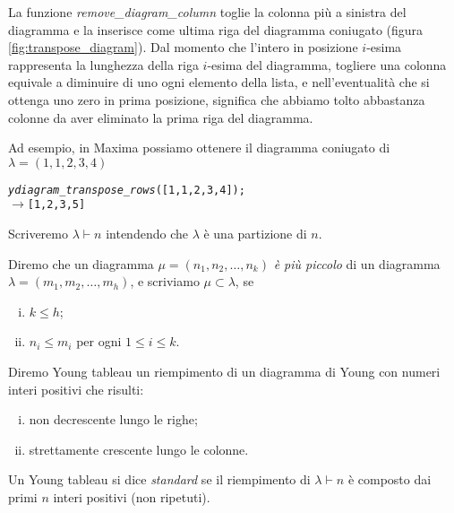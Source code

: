 La funzione \emph{remove\_diagram\_column} toglie la colonna pi\`u a
sinistra del diagramma e la inserisce come ultima riga del diagramma
coniugato (figura \ref{fig:transpose_diagram}). 
Dal momento che l'intero in posizione $i$-esima rappresenta
la lunghezza della riga $i$-esima del diagramma, togliere una colonna
equivale a diminuire di uno ogni elemento della lista, e
nell'eventualit\`a che si ottenga uno zero in prima posizione,
significa che abbiamo tolto abbastanza colonne da aver eliminato la
prima riga del diagramma.

Ad esempio, in Maxima possiamo ottenere il diagramma coniugato di
$\lambda=(1,1,2,3,4)$
\begin{alltt}
\emph{ydiagram\_transpose\_rows} ([1,1,2,3,4]);
\(\rightarrow\) [1,2,3,5]
\end{alltt}


\begin{notaz}
Scriveremo $\lambda \vdash n$ intendendo che $\lambda$ \`e una
partizione di $n$.
\end{notaz}

\begin{defn}
Diremo che un diagramma $\mu=(n_1,n_2,\dots,n_k)$ \emph{\`e pi\`u
piccolo} di un diagramma $\lambda=(m_1,m_2,\dots,m_h)$, e scriviamo
$\mu \subset \lambda$, se
\begin{enumerate}[(i)]
\item $k \leq h$;
\item $n_i \leq m_i$ per ogni $1 \leq i \leq k$.
\end{enumerate}
\end{defn}

\begin{defn}\label{ytab}
Diremo Young tableau un riempimento di un diagramma di Young con
numeri interi positivi che risulti:
\begin{enumerate}[(i)]
\item non decrescente lungo le righe;
\item strettamente crescente lungo le colonne.
\end{enumerate}
Un Young tableau si dice \emph{standard} se il riempimento di
$\lambda \vdash n$ \`e composto dai primi $n$ interi positivi (non
ripetuti).
\end{defn}

